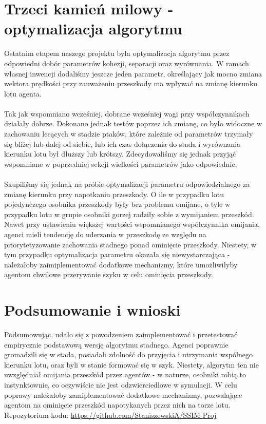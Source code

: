 \documentclass[a4paper,12pt]{article}
\begin{document}
\section{Trzeci kamień milowy - optymalizacja algorytmu}
Ostatnim etapem naszego projektu była optymalizacja algorytmu przez odpowiedni dobór parametrów kohezji, separacji oraz wyrównania. W ramach własnej inwencji dodaliśmy jeszcze jeden parametr, określający jak mocno zmiana wektora prędkości przy zauważeniu przeszkody ma wpływać na zmianę kierunku lotu agenta. \\\\
Tak jak wspomniano wcześniej, dobrane wcześniej wagi przy współczynnikach działały dobrze. Dokonano jednak testów poprzez ich zmianę, co było widoczne w zachowaniu lecących w stadzie ptaków, które zależnie od parametrów trzymały się bliżej lub dalej od siebie, lub ich czas dołączenia do stada i wyrównania kierunku lotu był dłuższy lub krótszy. Zdecydowaliśmy się jednak przyjąć wspomniane w poprzedniej sekcji wielkości parametrów jako odpowiednie. \\\\
Skupiliśmy się jednak na próbie optymalizacji parametru odpowiedzialnego za zmianę kierunku przy napotkaniu przeszkody. O ile w przypadku lotu pojedynczego osobnika przeszkody były bez problemu omijane, o tyle w przypadku lotu w grupie osobniki gorzej radziły sobie z wymijaniem przeszkód. Nawet przy ustawieniu większej wartości wspomnianego współczynnika omijania, agenci mieli tendencję do uderzania w przeszkodę ze względu na priorytetyzowanie zachowania stadnego ponad ominięcie przeszkody. Niestety, w tym przypadku optymalizacja parametru okazała się niewystarczająca - należałoby zaimiplementować dodatkowe mechanizmy, które umożliwiłyby agentom chwilowe przerywanie szyku w celu ominięcia przeszkody. 
\section{Podsumowanie i wnioski}
Podsumowując, udało się z powodzeniem zaimplementować i przetestować empirycznie podstawową wersję algorytmu stadnego. Agenci poprawnie gromadzili się w stada, posiadali zdolność do przyjęcia i utrzymania wspólnego kierunku lotu, oraz byli w stanie formować się w szyk. Niestety, algorytm ten nie uwzględniał omijania przeszkód przez agentów - w naturze, osobniki robią to instynktownie, co oczywiście nie jest odzwierciedlowe w symulacji. W celu poprawy należałoby zamiplementować dodatkowe mechanizmy, pozwalające agentom na ominięcie przeszkód napotykanych przez nich na torze lotu. \\

Repozytorium kodu:
\url{https://github.com/StaniszewskiA/SSIM-Proj}
\end{document}
